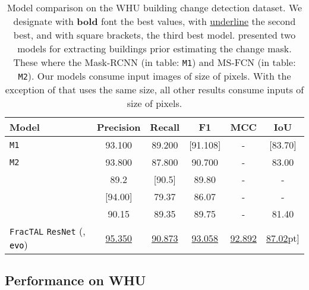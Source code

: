 \documentclass[times, 5p]{elsarticle}
\def \FracTAL {\texttt{FracTAL} }
\begin{document}
\begin{table*}
\footnotesize
\caption{Model comparison on the WHU building change detection dataset.  
We designate with \textbf{bold} font the best values,  with \underline{underline} the second best, and with square brackets,  the third best model. \cite{rs11111343} presented two models for extracting buildings prior estimating the change mask. These where the Mask-RCNN (in table: \texttt{M1}) and MS-FCN (in table: \texttt{M2}). Our models consume input images of  size of  pixels. With the exception of \cite{liu2019building} that uses the same size, all other results consume  inputs of size of  pixels. }
\label{whu_ceecnet_vs_resuneta_comparison}
\begin{center}
\begin{tabular}{|l |c|c|c|c|c| }
\hline
Model & Precision & Recall & F1 & MCC & IoU \\\hline
\cite{rs11111343} \texttt{M1} & 93.100 & 89.200 & [91.108] & - & [83.70] \\ 
\cite{rs11111343} \texttt{M2} & 93.800 & 87.800 & 90.700 & - & 83.00 \\
\cite{chen2020dasnet}   & 89.2 & [90.5] & 89.80 &- & - \\ 
\cite{Cao_2020}   & [94.00] & 79.37 & 86.07 & - & -  \\
\cite{liu2019building}  & 90.15 & 89.35 & 89.75 & - & 81.40
\\\hline\hline 
\FracTAL \texttt{ResNet} \textcolor{black}{(, \texttt{evo})}     & \underline{95.350} & \underline{90.873} &  \underline{93.058} &  \underline{92.892}  & \underline{87.02}\2pt]
\hline
\end{tabular}
\end{center}
\end{table*}



\subsection{Performance on WHU}
\label{whu_performance_section}
\end{document}
